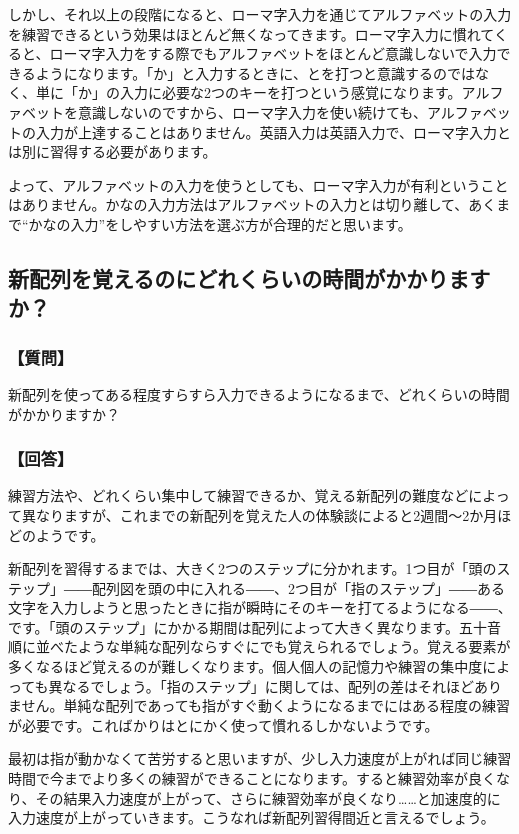 しかし、それ以上の段階になると、ローマ字入力を通じてアルファベットの入力を練習できるという効果はほとんど無くなってきます。ローマ字入力に慣れてくると、ローマ字入力をする際でもアルファベットをほとんど意識しないで入力できるようになります。「か」と入力するときに、とを打つと意識するのではなく、単に「か」の入力に必要な2つのキーを打つという感覚になります。アルファベットを意識しないのですから、ローマ字入力を使い続けても、アルファベットの入力が上達することはありません。英語入力は英語入力で、ローマ字入力とは別に習得する必要があります。

よって、アルファベットの入力を使うとしても、ローマ字入力が有利ということはありません。かなの入力方法はアルファベットの入力とは切り離して、あくまで“かなの入力”をしやすい方法を選ぶ方が合理的だと思います。

\subsection{新配列を覚えるのにどれくらいの時間がかかりますか？}

\subsubsection*{【質問】}

新配列を使ってある程度すらすら入力できるようになるまで、どれくらいの時間がかかりますか？

\subsubsection*{【回答】}

練習方法や、どれくらい集中して練習できるか、覚える新配列の難度などによって異なりますが、これまでの新配列を覚えた人の体験談によると2週間～2か月ほどのようです。

新配列を習得するまでは、大きく2つのステップに分かれます。1つ目が「頭のステップ」――配列図を頭の中に入れる――、2つ目が「指のステップ」――ある文字を入力しようと思ったときに指が瞬時にそのキーを打てるようになる――、です。「頭のステップ」にかかる期間は配列によって大きく異なります。五十音順に並べたような単純な配列ならすぐにでも覚えられるでしょう。覚える要素が多くなるほど覚えるのが難しくなります。個人個人の記憶力や練習の集中度によっても異なるでしょう。「指のステップ」に関しては、配列の差はそれほどありません。単純な配列であっても指がすぐ動くようになるまでにはある程度の練習が必要です。こればかりはとにかく使って慣れるしかないようです。

最初は指が動かなくて苦労すると思いますが、少し入力速度が上がれば同じ練習時間で今までより多くの練習ができることになります。すると練習効率が良くなり、その結果入力速度が上がって、さらに練習効率が良くなり……と加速度的に入力速度が上がっていきます。こうなれば新配列習得間近と言えるでしょう。

